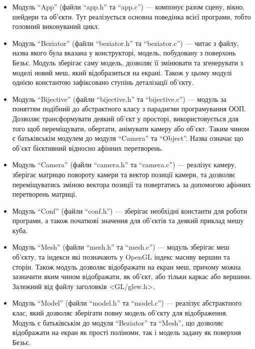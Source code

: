 \documentclass[14pt,a4paper]{extarticle}
\theoremstyle{definition}
\renewcommand{\[}{\begin{singlespace}\begin{equation*}}
\renewcommand{\]}{\end{equation*}\end{singlespace}}
\begin{document}
\begin{itemize}
\item Модуль ``App'' (файли ``app.h'' та ``app.c'') --- компонує разом сцену, вікно, шейдери та об'єкти. Тут реалізується основна поведінка всієї програми, тобто головний виконуваний цикл.

\item Модуль ``Beziator'' (файли ``beziator.h'' та ``beziator.c'') --- читає з файлу, назва якого була вказана у конструкторі, модель, побудовану з поверхонь Безьє. Модуль зберігає саму модель, дозволяє її змінювати та згенерувати з моделі новий меш, який відобразиться на екрані. Також у цьому модулі однією константою зафіксовано ступінь деталізації об'єкту.

\item Модуль ``Bijective'' (файли ``bijective.h'' та ``bijective.c'') --- модуль за поняттям подібний до абстрактного класу з парадигми програмування ООП. Дозволяє трансформувати деякий об'єкт у просторі, використовується для того щоб переміщувати, обертати, анімувати камеру або об'єкт. Таким чином є батьківськім модулем до модуля ``Camera'' та ``Object''. Назва означає що об'єкт бієктивний відносно афінних перетворень.

\item Модуль ``Camera'' (файли ``camera.h'' та ``camera.c'') --- реалізує камеру, зберігає матрицю повороту камери та вектор позиції камери, та дозволяє переміщуватись зміною вектора позиції та повертатись за допомогою афінних перетворень матриці.

\item Модуль ``Conf'' (файли ``conf.h'') --- зберігає необхідні константи для роботи програми, а також початкові значення для об'єктів та деякий приклад мешу куба.

\item Модуль ``Mesh'' (файли ``mesh.h'' та ``mesh.c'') --- модуль зберігає меш об'єкту, та індекси які позначають у OpenGL індекс масиву вершин та сторін. Також модуль дозволяє відображати на екран меш, причому можна зазначити яким чином відображати, як об'єкт, або тільки каркас або вершини. Залежний від файлу заголовків <GL/glew.h>.

\item Модуль ``Model'' (файли ``model.h'' та ``model.c'') --- реалізує абстрактного клас, який дозволяє зберігати повну модель об'єкту для відображення. Модуль є батьківськім до модуля ``Beziator'' та ``Mesh'', що дозволяє відображати на екран як прості поліноми, так і модель задану як поверхня Безьє.


\end{itemize}
\end{document}
